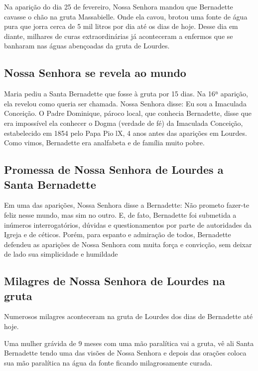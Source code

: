 \documentclass[18pt]{article}
\begin{document}
\begin{justify}
Na aparição do dia 25 de fevereiro, Nossa Senhora mandou que Bernadette cavasse o chão na gruta Massabielle. Onde ela cavou, brotou uma fonte de água pura que jorra cerca de 5 mil litros por dia até os dias de hoje. Desse dia em diante, milhares de curas extraordinárias já aconteceram a enfermos que se banharam nas águas abençoadas da gruta de Lourdes.


\begin{justify}
\subsection{Nossa Senhora se revela ao mundo}
\end{justify}

Maria pediu a Santa Bernadette que fosse à gruta por 15 dias. Na 16ª aparição, ela revelou como queria ser chamada. Nossa Senhora disse: Eu sou a Imaculada Conceição. O Padre Dominique, pároco local, que conhecia Bernadette, disse que era impossível ela conhecer o Dogma (verdade de fé) da Imaculada Conceição, estabelecido em 1854 pelo Papa Pio lX, 4 anos antes das aparições em Lourdes. Como vimos, Bernadette era analfabeta e de família muito pobre.


\begin{justify}
\subsection{Promessa de Nossa Senhora de Lourdes a Santa Bernadette}
\end{justify}

Em uma das aparições, Nossa Senhora disse a Bernadette: Não prometo fazer-te feliz nesse mundo, mas sim no outro. E, de fato, Bernadette foi submetida a inúmeros interrogatórios, dúvidas e questionamentos por parte de autoridades da Igreja e de céticos. Porém, para espanto e admiração de todos, Bernadette defendeu as aparições de Nossa Senhora com muita força e convicção, sem deixar de lado sua simplicidade e humildade


\begin{justify}
\subsection{Milagres de Nossa Senhora de Lourdes na gruta}
\end{justify}

Numerosos milagres aconteceram na gruta de Lourdes dos dias de Bernadette até hoje.

Uma mulher grávida de 9 meses com uma mão paralítica vai a gruta, vê ali Santa Bernadette tendo uma das visões de Nossa Senhora e depois das orações coloca sua mão paralítica na água da fonte ficando milagrosamente curada.


\end{justify}
\end{document}
